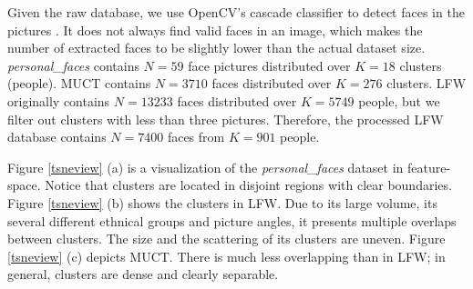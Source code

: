 \documentclass[conference]{IEEEtran}
\begin{document}
Given the raw database, we use OpenCV's cascade classifier to detect faces in the pictures \cite{??}.
It does not always find valid faces in an image, which makes the number of extracted faces to be slightly lower than the actual dataset size.
\textit{personal\_faces} contains $N = 59$ face pictures distributed over $K = 18$ clusters (people).
MUCT contains $N = 3710$ faces distributed over $K = 276$ clusters.
LFW originally contains $N = 13233$ faces distributed over $K = 5749$ people, but we filter out clusters with less than three pictures.
Therefore, the processed LFW database contains $N = 7400$ faces from $K = 901$ people.

Figure \ref{tsneview} (a) is a visualization of the \textit{personal\_faces} dataset in feature-space.
Notice that clusters are located in disjoint regions with clear boundaries.
Figure \ref{tsneview} (b) shows the clusters in LFW.
Due to its large volume, its several different ethnical groups and picture angles, it presents multiple overlaps between clusters.
The size and the scattering of its clusters are uneven.
Figure \ref{tsneview} (c) depicts MUCT.
There is much less overlapping than in LFW; in general, clusters are dense and clearly separable.
\end{document}
